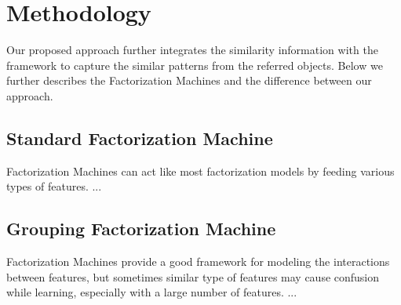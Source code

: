 \chapter{Methodology}

Our proposed approach further integrates the similarity information with the framework
to capture the similar patterns from the referred objects.  Below we further describes
the Factorization Machines and the difference between our approach.


\section{Standard Factorization Machine}
Factorization Machines can act like most factorization models by feeding various
types of features. ...

\section{Grouping Factorization Machine}
Factorization Machines provide a good framework for modeling the interactions
between features, but sometimes similar type of features may cause confusion
while learning, especially with a large number of features. ...
